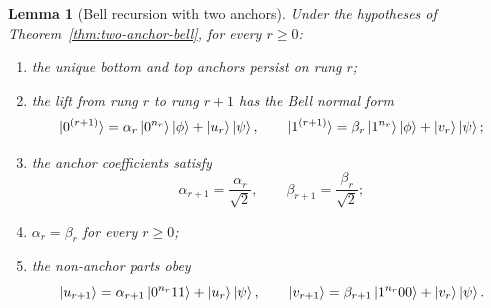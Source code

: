 \documentclass[11pt]{article}
\newcommand{\ketphi}{\ket{\phi}}
\newcommand{\ketpsi}{\ket{\psi}}
\newtheorem{lemma}[theorem]{Lemma}
\begin{document}
\begin{lemma}[Bell recursion with two anchors]
\label{lem:bell-recursion}
Under the hypotheses of Theorem~\ref{thm:two-anchor-bell}, for every $r\ge0$:
\begin{enumerate}[label=\textup{(\roman*)}]
\item the unique bottom and top anchors persist on rung $r$;
\item the lift from rung $r$ to rung $r+1$ has the Bell normal form
\begin{equation}
  \ket{0^{(r+1)}}=\alpha_r\ket{0^{n_r}}\ketphi+\ket{u_r}\ketpsi,
  \qquad
  \ket{1^{(r+1)}}=\beta_r\ket{1^{n_r}}\ketphi+\ket{v_r}\ketpsi;
  \label{eq:bell-recursion-r}
\end{equation}
\item the anchor coefficients satisfy
\begin{equation}
  \alpha_{r+1}=\frac{\alpha_r}{\sqrt2},
  \qquad
  \beta_{r+1}=\frac{\beta_r}{\sqrt2};
  \label{eq:anchor-halving}
\end{equation}
\item $\alpha_r=\beta_r$ for every $r\ge0$;
\item the non-anchor parts obey
\begin{equation}
  \ket{u_{r+1}}=\alpha_{r+1}\ket{0^{n_r}11}+\ket{u_r}\ketpsi,
  \qquad
  \ket{v_{r+1}}=\beta_{r+1}\ket{1^{n_r}00}+\ket{v_r}\ketpsi.
  \label{eq:uv-recursion}
\end{equation}
\end{enumerate}
\end{lemma}
\end{document}

